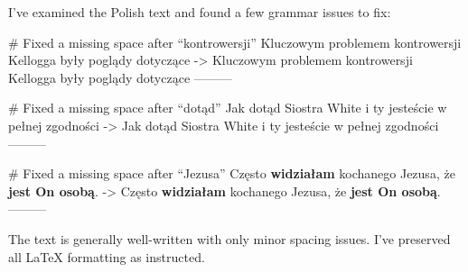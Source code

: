 I've examined the Polish text and found a few grammar issues to fix:

# Fixed a missing space after “kontrowersji”
Kluczowym problemem kontrowersji  Kellogga były poglądy dotyczące
->
Kluczowym problemem kontrowersji Kellogga były poglądy dotyczące
---------

# Fixed a missing space after “dotąd”
Jak dotąd  Siostra White i ty jesteście w pełnej zgodności
->
Jak dotąd Siostra White i ty jesteście w pełnej zgodności
---------

# Fixed a missing space after “Jezusa”
Często \textbf{widziałam} kochanego  Jezusa, że \textbf{jest On osobą}.
->
Często \textbf{widziałam} kochanego Jezusa, że \textbf{jest On osobą}.
---------

The text is generally well-written with only minor spacing issues. I've preserved all LaTeX formatting as instructed.